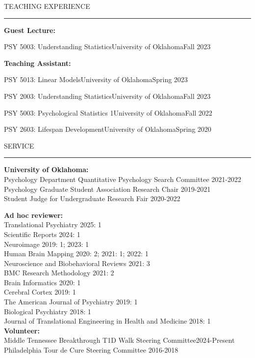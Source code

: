 \documentclass{resume} %
\renewenvironment{rSection}[1]{
\sectionskip
\textcolor{CarnegieMellonRed}{\MakeUppercase{#1}}
\sectionlineskip
\hrule
\begin{list}{}{
\setlength{\leftmargin}{1.5em}
}
\item[]
}{
\end{list}
}
\begin{document}
\begin{rSection}{Teaching Experience}
\bf{Guest Lecture:}\\
\begin{rSubsectionTeach}{PSY 5003: Understanding Statistics}{University of Oklahoma}{Fall 2023}
\end{rSubsectionTeach}

\bf{Teaching Assistant:}\\
\begin{rSubsectionTeach}{PSY 5013: Linear Models}{University of Oklahoma}{Spring 2023}
\end{rSubsectionTeach}
\begin{rSubsectionTeach}{PSY 2003: Understanding Statistics}{University of Oklahoma}{Fall 2023}
\end{rSubsectionTeach}
\begin{rSubsectionTeach}{PSY 5003: Psychological Statistics 1}{University of Oklahoma}{Fall 2022}
\end{rSubsectionTeach}
\begin{rSubsectionTeach}{PSY 2603: Lifespan Development}{University of Oklahoma}{Spring 2020}
\end{rSubsectionTeach}
    
\end{rSection}

\begin{rSection}{Service}
\textbf{University of Oklahoma:} \\
Psychology Department Quantitative Psychology Search Committee \hfill2021-2022 \\
Psychology Graduate Student Association Research Chair \hfill2019-2021 \\
Student Judge for Undergraduate Research Fair \hfill2020-2022

\textbf{Ad hoc reviewer:}\\
Translational Psychiatry \hfill 2025: 1\\
Scientific Reports \hfill2024: 1 \\
Neuroimage \hfill2019: 1; 2023: 1 \\
Human Brain Mapping \hfill2020: 2; 2021: 1; 2022: 1 \\
Neuroscience and Biobehavioral Reviews \hfill2021: 3 \\
BMC Research Methodology \hfill2021: 2 \\
Brain Informatics \hfill2020: 1 \\
Cerebral Cortex \hfill2019: 1 \\
The American Journal of Psychiatry \hfill2019: 1 \\
Biological Psychiatry \hfill2018: 1 \\
Journal of Translational Engineering in Health and Medicine \hfill2018: 1 \\

\textbf{Volunteer:}\\
Middle Tennessee Breakthrough T1D Walk Steering Committee\hfill 2024-Present\\
Philadelphia Tour de Cure Steering Committee \hfill2016-2018
\end{rSection}
\end{document}
